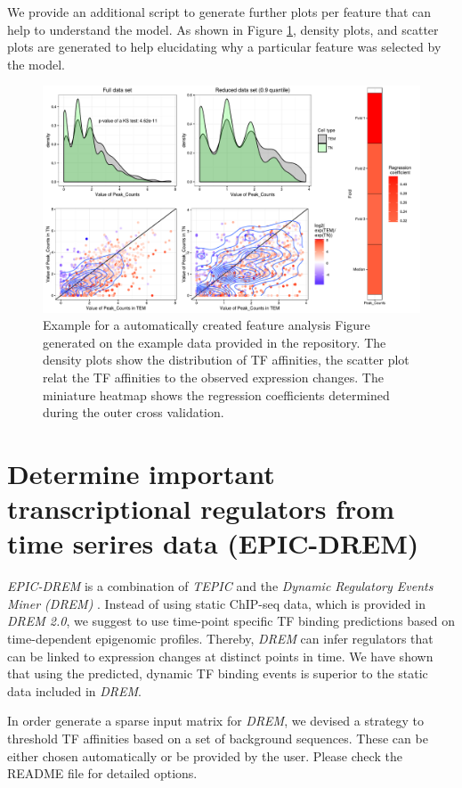 \documentclass{article}
\begin{document}
We provide an additional script to generate further plots per feature that can help to understand the model. As shown in Figure \ref{ExampleAnalysisOfDynamite},
density plots, and scatter plots are generated to help elucidating why a particular feature was selected by the model.
\begin{figure}[h!]
\centering
\includegraphics[width=\textwidth]{Feature_overview_TEMvsTN_Peak_Counts.pdf}
\caption{Example for a automatically created feature analysis Figure generated on the example data provided in the repository. The density plots show the distribution of TF affinities, the
scatter plot relat the TF affinities to the observed expression changes. The miniature heatmap shows the regression coefficients determined during the outer cross validation.}
\label{ExampleAnalysisOfDynamite}
\end{figure}

\newpage
\section{Determine important transcriptional regulators from time serires data (EPIC-DREM)}
\label{EPIC-DREM}
\textit{EPIC-DREM} is a combination of \textit{TEPIC}  and the \textit{Dynamic Regulatory Events Miner (DREM)} \cite{pmid17224918}.
Instead of using static ChIP-seq data, which is provided in \textit{DREM 2.0}, we suggest to use time-point specific TF binding predictions
based on time-dependent epigenomic profiles. Thereby, \textit{DREM} can infer regulators that can be linked to expression changes at distinct points in time.
We have shown that using the predicted, dynamic TF binding events is superior to the static data included in \textit{DREM}.

In order generate a sparse input matrix for \textit{DREM}, we devised a strategy to threshold TF affinities based on a set of background sequences.
These can be either chosen automatically or be provided by the user. Please check the README file for detailed options. 
\end{document}
